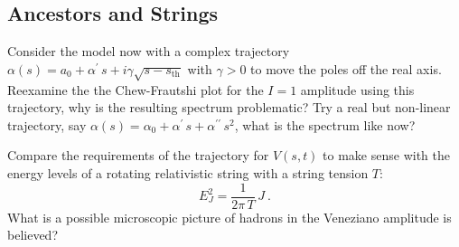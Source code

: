 \subsection{Ancestors and Strings}
Consider the model now with a complex trajectory $\alpha(s) = a_0 + \alpha^\prime \, s + i \gamma \sqrt{s-s_\text{th}}$ with $\gamma >0$ to move the poles off the real axis. Reexamine the the Chew-Frautshi plot for the $I=1$ amplitude using this trajectory, why is the resulting spectrum problematic? Try a real but non-linear trajectory, say $\alpha(s) = \alpha_0 + \alpha^\prime \, s + \alpha^{\prime\prime} \, s^2$, what is the spectrum like now?

Compare the requirements of the trajectory for $V(s,t)$ to make sense with the energy levels of a rotating relativistic string with a string tension $T$:
    \begin{equation}
        E_J^2 = \frac{1}{2\pi \, T} \, J ~.
    \end{equation}
What is a possible microscopic picture of hadrons in the Veneziano amplitude is believed? 
